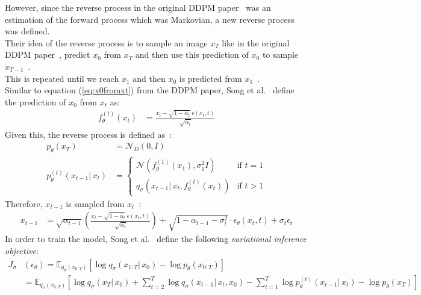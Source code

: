 \documentclass{article}
\numberwithin{equation}{section}
\numberwithin{figure}{section}
\begin{document}
However, since the reverse process in the original DDPM paper~\cite{ho2020denoising} was an estimation of the forward process which was Markovian, a new reverse process was defined. \\
Their idea of the reverse process is to sample an image $x_T$ like in the original DDPM paper~\cite{ho2020denoising}, predict $x_0$ from $x_T$ and then use this prediction of $x_0$ to sample $x_{T-1}$~\cite{song2022denoising}. \\
This is repeated until we reach $x_1$ and then $x_0$ is predicted from $x_1$~\cite{song2022denoising}. \\
Similar to equation (\ref{eq:x0fromxt}) from the DDPM paper, Song et al.~\cite{song2022denoising} define the prediction of $x_0$ from $x_t$ as:
\begin{align}
  f_\theta^{(t)} (x_t) &= \frac{x_t - \sqrt{1 - \bar{\alpha}_t} \: \epsilon(x_t, t)}{\sqrt{\bar{\alpha}_t}}
\end{align}
Given this, the reverse process is defined as~\cite{song2022denoising}:
\begin{align}
  p_\theta (x_T) &= \mathcal{N}_D(0, I) \\
  p_\theta^{(t)} (x_{t-1} | \, x_t) &= \begin{cases}
    \mathcal{N}(f_\theta^{(1)}(x_{1}), \sigma_1^2 I) & \text{if } t = 1 \\
    q_\sigma(x_{t-1} | \, x_t, f_\theta^{(t)}(x_t)) & \text{if } t > 1
  \end{cases}
\end{align}
Therefore, $x_{t-1}$ is sampled from $x_t$~\cite{song2022denoising}: 
\begin{align}
  x_{t-1} &= \sqrt{\alpha_{t-1}} \left( \frac{x_t - \sqrt{1 - \bar{\alpha}_t} \: \epsilon(x_t, t)}{\sqrt{\bar{\alpha}_t}} \right) + \sqrt{1 - \alpha_{t-1} - \sigma_t^2} \cdot \epsilon_\theta (x_t, t) + \sigma_t \epsilon_t
\end{align}
In order to train the model, Song et al.~\cite{song2022denoising} define the following \textit{variational inference objective}:
\begin{align}
  J_\sigma & (\epsilon_\theta) = \mathbb{E}_{q_\sigma (x_{0:T})} \left[ \log q_\sigma (x_{1:T} | \, x_0) - \log p_\theta (x_{0:T}) \right] \\
  &= \mathbb{E}_{q_\sigma (x_{0:T})} \left[ \log q_\sigma (x_T | \, x_0) + \sum_{t=2}^{T} \log q_\sigma (x_{t-1} | \, x_t, x_0) - \sum_{t=1}^{T} \log p_\theta^{(t)} (x_{t-1} | \, x_t) - \log p_\theta (x_T) \right]
\end{align}
\end{document}
